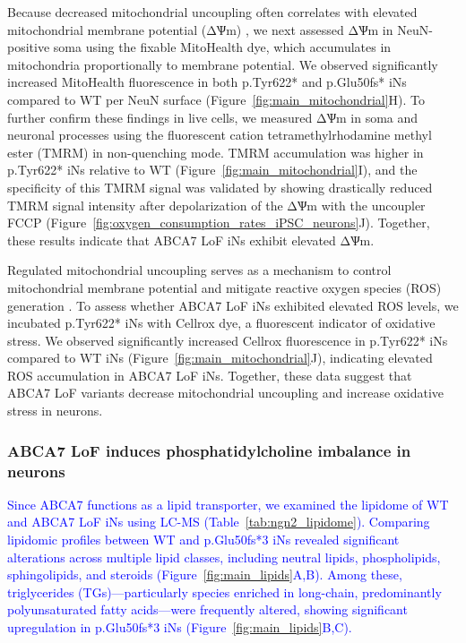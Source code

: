 Because decreased mitochondrial uncoupling often correlates with elevated mitochondrial membrane potential (ΔѰm) \cite{Demine2019-yq,Zorov2021-sj}, we next assessed ΔѰm in NeuN-positive soma using the fixable MitoHealth dye, which accumulates in mitochondria proportionally to membrane potential. We observed significantly increased MitoHealth fluorescence in both p.Tyr622* and p.Glu50fs* iNs compared to WT per NeuN surface (Figure~\ref{fig:main_mitochondrial}H). To further confirm these findings in live cells, we measured ΔѰm in soma and neuronal processes using the fluorescent cation tetramethylrhodamine methyl ester (TMRM) in non-quenching mode. TMRM accumulation was higher in p.Tyr622* iNs relative to WT (Figure~\ref{fig:main_mitochondrial}I), and the specificity of this TMRM signal was validated by showing drastically reduced TMRM signal intensity after depolarization of the ΔѰm with the uncoupler FCCP (Figure~\ref{fig:oxygen_consumption_rates_iPSC_neurons}J). Together, these results indicate that ABCA7 LoF iNs exhibit elevated ΔѰm.

Regulated mitochondrial uncoupling serves as a mechanism to control mitochondrial membrane potential and mitigate reactive oxygen species (ROS) generation \cite{Monteiro2021-ei,Demine2019-yq}. To assess whether ABCA7 LoF iNs exhibited elevated ROS levels, we incubated p.Tyr622* iNs with Cellrox dye, a fluorescent indicator of oxidative stress. We observed significantly increased Cellrox fluorescence in p.Tyr622* iNs compared to WT iNs (Figure~\ref{fig:main_mitochondrial}J), indicating elevated ROS accumulation in ABCA7 LoF iNs. Together, these data suggest that ABCA7 LoF variants decrease mitochondrial uncoupling and increase oxidative stress in neurons.

\subsubsection{ABCA7 LoF induces phosphatidylcholine imbalance in neurons}
\newcommand{\quoteA}{\textcolor{blue}{Since ABCA7 functions as a lipid transporter, we examined the lipidome of WT and ABCA7 LoF iNs using LC-MS (Table~\ref{tab:ngn2_lipidome}). Comparing lipidomic profiles between WT and p.Glu50fs*3 iNs revealed significant alterations across multiple lipid classes, including neutral lipids, phospholipids, sphingolipids, and steroids (Figure~\ref{fig:main_lipids}A,B). Among these, triglycerides (TGs)—particularly species enriched in long-chain, predominantly polyunsaturated fatty acids—were frequently altered, showing significant upregulation in p.Glu50fs*3 iNs (Figure~\ref{fig:main_lipids}B,C).\label{quoteA-label}}}
\quoteA

